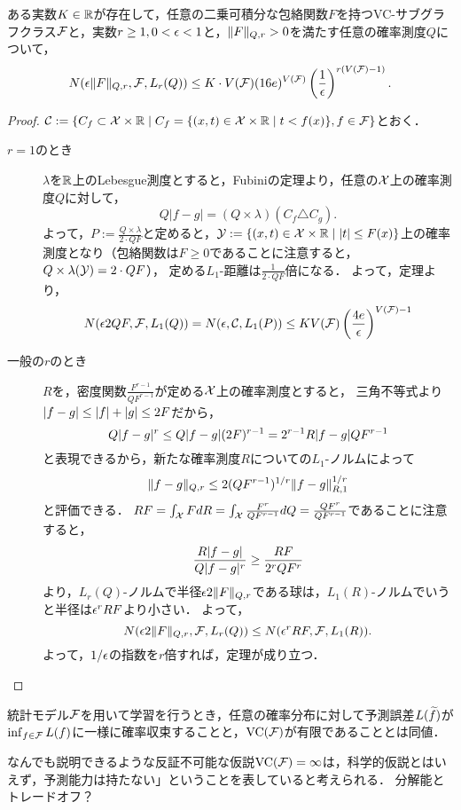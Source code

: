 \documentclass[uplatex,dvipdfmx]{jsreport}
\renewcommand{\C}{\mathcal{C}}
\begin{document}
\begin{theorem}
ある実数$K\in\mathbb{R}$が存在して，任意の二乗可積分な包絡関数$F$を持つVC-サブグラフクラス$\mathcal{F}$と，実数$r\ge 1,0<\epsilon<1$と，$\|F\|_{Q,r}>0$を満たす任意の確率測度$Q$について，
\[N(\epsilon\|F\|_{Q,r},\mathcal{F},L_r(Q))\le K\cdot V(\mathcal{F})(16e)^{V(\mathcal{F})}\left(\frac{1}{\epsilon}\right)^{r(V(\mathcal{F})-1)}.\]
\end{theorem}
\begin{proof}
    $\C:=\Brace{C_f\subset\X\times\R\mid C_f=\{(x,t)\in\X\times\R\mid t<f(x)\},f\in\F}$とおく．
    \begin{description}
        \item[$r=1$のとき] $\lambda$を$\mathbb{R}$上のLebesgue測度とすると，Fubiniの定理より，任意の$\mathcal{X}$上の確率測度$Q$に対して，
        \[Q|f-g|=(Q\times\lambda)(C_f\triangle C_g).\]
        よって，$P:=\frac{Q\times\lambda}{2\cdot QF}$と定めると，$\mathcal{Y}:=\left\{(x,t)\in\mathcal{X}\times\mathbb{R}\mid\lvert t\rvert\le F(x)\right\}$上の確率測度となり（包絡関数は$F\ge 0$であることに注意すると，$Q\times\lambda(\mathcal{Y})=2\cdot QF$），
        定める$L_1$-距離は$\frac{1}{2\cdot QF}$倍になる．
        よって，定理より，
        \[N(\ep 2QF,\F,L_1(Q))=N(\ep,\C,L_1(P))\le KV(\F)\paren{\frac{4e}{\ep}}^{V(\F)-1}\]
        \item[一般の$r$のとき]
        $R$を，密度関数$\frac{F^{r-1}}{QF^{r-1}}$が定める$\mathcal{X}$上の確率測度とすると，
        三角不等式より$\lvert f-g\rvert\le\lvert f\rvert+\lvert g\rvert\le 2F$だから，
        \[Q\lvert f-g\rvert^r\le Q\lvert f-g\rvert(2F)^{r-1}=2^{r-1}R\lvert f-g\rvert QF^{r-1}\]
        と表現できるから，新たな確率測度$R$についての$L_1$-ノルムによって
        \[\|f-g\|_{Q,r}\le 2(QF^{r-1})^{1/r}\|f-g\|_{R,1}^{1/r}\]
        と評価できる．
        $RF=\int_{\mathcal{X}} FdR=\int_{\mathcal{X}}\frac{F^r}{QF^{r-1}}dQ=\frac{QF^r}{QF^{r-1}}$であることに注意すると，
        \[\frac{R\lvert f-g\rvert}{Q\lvert f-g\rvert^r}\ge\frac{RF}{2^rQF^r}\]
        より，$L_r(Q)$-ノルムで半径$\epsilon 2\|F\|_{Q,r}$である球は，$L_1(R)$-ノルムでいうと半径は$\epsilon^rRF$より小さい．
        よって，
        \[N(\epsilon 2\|F\|_{Q,r},\mathcal{F},L_r(Q))\le N(\epsilon^rRF,\mathcal{F},L_1(R)).\]
        よって，$1/\epsilon$の指数を$r$倍すれば，定理が成り立つ．
    \end{description}
\end{proof}

\begin{theorem}
    統計モデル$\mathcal{F}$を用いて学習を行うとき，任意の確率分布に対して予測誤差$L(\widetilde{f})$が$\inf_{f\in\mathcal{F}}L(f)$に一様に確率収束することと，$\mathrm{VC}(\mathcal{F})$が有限であることとは同値．
\end{theorem}
\begin{remarks}
    なんでも説明できるような反証不可能な仮説$\mathrm{VC}(\mathcal{F})=\infty$は，科学的仮説とはいえず，予測能力は持たない」ということを表していると考えられる．
    分解能とトレードオフ？
\end{remarks}
\end{document}
